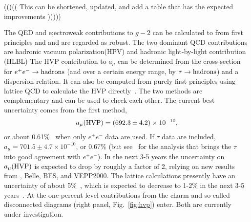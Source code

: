 








((((( This can be shortened, updated, and add a table that has the expected improvements )))))


The QED and e;ectroweak contributions to $g-2$ can be calculated to from first principles and
and are regarded as robust.  The two dominant QCD contributions are hadronic vacuum polarization(HPV) and hadronic light-by-light contribution (HLBL) 
The HVP contribution to $a_\mu$ can be determined from the
cross-section for $e^+e^-\to\rm hadrons$ (and over a certain energy
range, by $\tau\to\rm hadrons$) and a dispersion relation. It can also
be computed from purely first principles using lattice QCD to
calculate the HVP directly~\cite{hep-lat/0212018}. The two methods are
complementary and can be used to check each other. The current best
uncertainty comes from the first method,
\begin{equation}
a_\mu(\rm HVP)=(692.3\pm4.2)\times 10^{-10},
\end{equation}
or about 0.61\%~\cite{arXiv:1010.4180} when only $e^+e^-$ data are used. 
If $\tau$ data are included, $a_\mu=701.5\pm4.7\times 10^{-10}$, or 0.67\% 
(but see~\cite{arXiv:1101.2872} for the analysis that brings the $\tau$ 
into good agreement with $e^+e^-$). In the next 3-5 years the uncertainty on 
$a_\mu(\rm HVP)$ is expected to drop by roughly a factor of 2, relying 
on new results from {\babar}, Belle, BES, and VEPP2000.
The lattice calculations presently have an uncertainty of 
about 5\%~\cite{hep-lat/0608011, arXiv:1103.4818, Boyle:2011hu,  DellaMorte:2011aa}, which is 
expected to decrease to 1-2\% in the next 3-5 years~\cite{USQCD}. At the 
one-percent level contributions from the charm and so-called disconnected 
diagrams (right panel, Fig.~\ref{fig:hvp}) enter. Both are currently under investigation.
%

